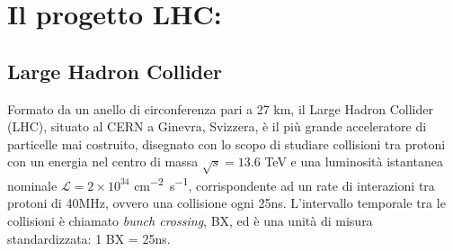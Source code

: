 \chapter{Il progetto LHC:}


\section{Large Hadron Collider}
Formato da un anello di circonferenza pari a 27 km, il Large Hadron Collider (LHC), situato al CERN a Ginevra, Svizzera, è il più grande acceleratore di particelle mai costruito, disegnato con lo scopo di studiare collisioni tra protoni con un energia nel centro di massa $\sqrt{s} = 13.6$ TeV e una luminosità istantanea nominale $\mathcal{L} = 2 \times 10^{34}$ \si{cm^{-2} s^{-1}}, corrispondente ad un rate di interazioni tra protoni di 40MHz, ovvero una collisione ogni 25ns. L'intervallo temporale tra le collisioni è chiamato \textit{bunch crossing}, BX, ed è una unità di misura standardizzata: 1 BX = 25ns.


